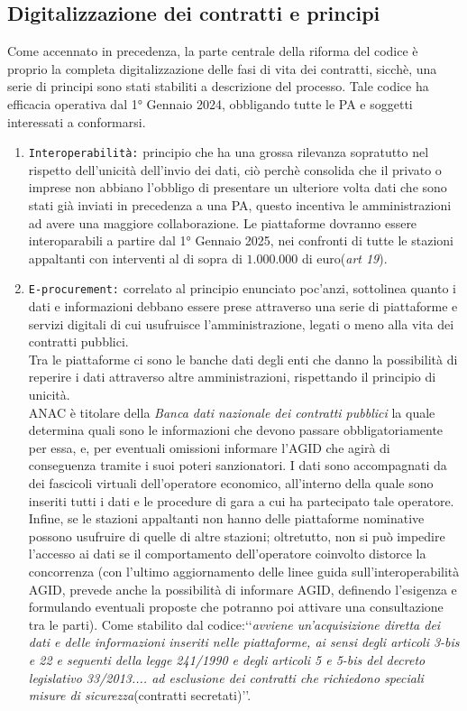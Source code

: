 \documentclass{article}
\begin{document}
\newpage\subsection{Digitalizzazione dei contratti e principi}
\begin{justify}
    Come accennato in precedenza, la parte centrale della riforma del codice è proprio la completa digitalizzazione delle fasi di vita dei contratti, sicchè, una serie di principi sono stati stabiliti a descrizione del processo.
    Tale codice ha efficacia operativa dal 1° Gennaio 2024, obbligando tutte le PA e soggetti interessati a conformarsi.\\
    \begin{enumerate}
        \item \texttt{Interoperabilità:} principio che ha una grossa rilevanza sopratutto nel rispetto dell'unicità dell'invio dei dati, ciò perchè consolida che il privato o imprese non abbiano l'obbligo di presentare un ulteriore volta dati che sono stati già inviati in precedenza a una PA, questo incentiva le amministrazioni ad avere una maggiore collaborazione. Le piattaforme dovranno essere interoparabili a partire dal 1° Gennaio 2025, nei confronti di tutte le stazioni appaltanti con interventi al di sopra di $1.000.000$ di euro(\textit{art 19}).
        \item \texttt{E-procurement:} correlato al principio enunciato poc'anzi, sottolinea quanto i dati e informazioni debbano essere prese attraverso una serie di piattaforme e servizi digitali di cui usufruisce l'amministrazione, legati o meno alla vita dei contratti pubblici.\\ Tra le piattaforme ci sono le banche dati degli enti che danno la possibilità di reperire i dati attraverso altre amministrazioni, rispettando il principio di unicità.\\
        ANAC è titolare della \textit{Banca dati nazionale dei contratti pubblici} la quale determina quali sono le informazioni che devono passare obbligatoriamente per essa, e, per eventuali omissioni informare l'AGID che agirà di conseguenza tramite i suoi poteri sanzionatori. I dati sono accompagnati da dei fascicoli virtuali dell'operatore economico, all'interno della quale sono inseriti tutti i dati e le procedure di gara a cui ha partecipato tale operatore. Infine, se le stazioni appaltanti non hanno delle piattaforme nominative possono usufruire di quelle di altre stazioni; oltretutto, non si può impedire l'accesso ai dati se il comportamento dell'operatore coinvolto distorce la concorrenza (con l'ultimo aggiornamento delle linee guida sull'interoperabilità AGID, prevede anche la possibilità di informare AGID, definendo l'esigenza e formulando eventuali proposte che potranno poi attivare una consultazione tra le parti\citep{AGID_linee_2023}). Come stabilito dal codice:‘‘\textit{avviene un'acquisizione diretta dei dati e delle informazioni inseriti nelle piattaforme, ai sensi degli articoli 3-bis e 22 e seguenti della legge 241/1990 e degli articoli 5 e 5-bis del decreto legislativo 33/2013.... ad esclusione dei contratti che richiedono speciali misure di sicurezza}(contratti secretati)’’.\\

\end{enumerate}
\end{justify}
\end{document}
